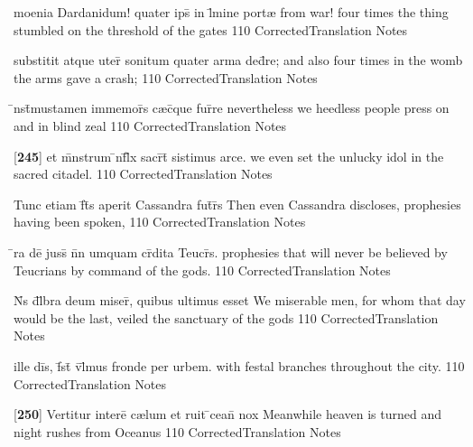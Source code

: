 \latline
  {moenia Dardanidum! quater ips\={} in l\={\macron {\i}}mine port{\ae}}
  { from war!  four times the thing stumbled on the threshold of the gates }
  {110}
  { CorrectedTranslation }
  { Notes }


\latline
  {substitit atque uter\={} sonitum quater arma ded\={}re;}
  { and also four times in the womb the arms gave a crash; }
  {110}
  { CorrectedTranslation }
  { Notes }


\latline
  {\={\macron {\i}}nst\={}mustamen immemor\={}s c{\ae}c\={\macron {\i}}que fur\={}re}
  { nevertheless we heedless people press on and in blind zeal }
  {110}
  { CorrectedTranslation }
  { Notes }


\latline
  {[\textbf{245}] et m\={}nstrum \={\macron {\i}}nf\={}l\={\macron {\i}}x sacr\={}t\={} sistimus arce.}
  { we even set the unlucky idol in the sacred citadel. }
  {110}
  { CorrectedTranslation }
  { Notes }


\latline
  {Tunc etiam f\={}t\={\macron {\i}}s aperit Cassandra fut\={}r\={\macron {\i}}s}
  { Then even Cassandra discloses, prophesies having been spoken, }
  {110}
  { CorrectedTranslation }
  { Notes }


\latline
  {\={}ra de\={\macron {\i}}  juss\={} n\={}n umquam cr\={}dita Teucr\={\macron {\i}}s.}
  { prophesies that will never be believed by Teucrians by command of the gods.  }
  {110}
  { CorrectedTranslation }
  { Notes }


\latline
  {N\={}s d\={}l\={}bra deum miser\={\macron {\i}}, quibus ultimus esset}
  { We miserable men, for whom that day would be the last, veiled the sanctuary of the gods }
  {110}
  { CorrectedTranslation }
  { Notes }


\latline
  {ille di\={}s, f\={}st\={} v\={}l\={}mus fronde per urbem.}
  { with festal branches throughout the city. }
  {110}
  { CorrectedTranslation }
  { Notes }


\latline
  {[\textbf{250}] Vertitur intere\={} c{\ae}lum et ruit \={}cean\={} nox}
  { Meanwhile heaven is turned and night rushes from Oceanus }
  {110}
  { CorrectedTranslation }
  { Notes }


